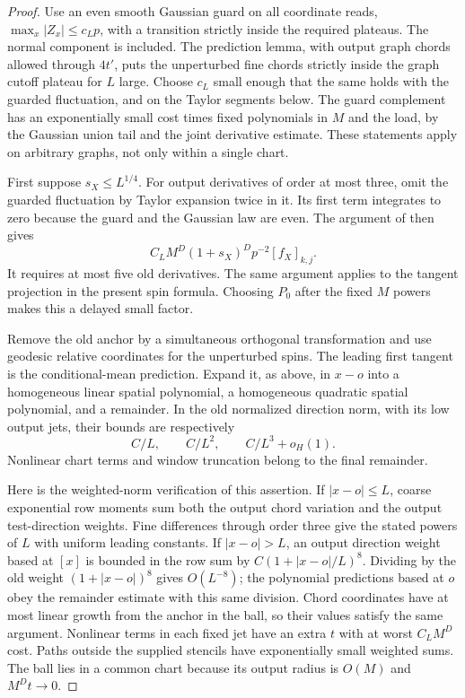 \begin{proof}
Use an even smooth Gaussian guard on all coordinate reads,
$\max_x|Z_x|\le c_Lp$, with a transition strictly inside the required
plateaus.  The normal component is included.  The prediction lemma,
with output graph chords allowed through $4t'$, puts the unperturbed
fine chords strictly inside the graph cutoff plateau for $L$ large.
Choose $c_L$ small enough that the same holds with the guarded
fluctuation, and on the Taylor segments below.  The guard complement
has an exponentially small cost times fixed polynomials in $M$ and
the load, by the Gaussian union tail and the joint derivative
estimate.  These statements apply on arbitrary graphs, not only
within a single chart.

First suppose $s_X\le L^{1/4}$.  For output derivatives of order at
most three, omit the guarded fluctuation by Taylor expansion twice
in it.  Its first term integrates to zero because the guard and the
Gaussian law are even.  The argument of
 then gives
\[
 C_LM^D(1+s_X)^Dp^{-2}[f_X]_{k,j}.
\]
It requires at most five old derivatives.  The same argument applies
to the tangent projection in the present spin formula.  Choosing
$P_0$ after the fixed $M$ powers makes this a delayed small factor.

Remove the old anchor by a simultaneous orthogonal transformation
and use geodesic relative coordinates for the unperturbed spins.
The leading first tangent is the conditional-mean prediction.  Expand
it, as above, in $x-o$ into a homogeneous linear spatial polynomial,
a homogeneous quadratic spatial polynomial, and a remainder.  In the
old normalized direction norm, with its low output jets, their bounds
are respectively
\begin{equation}
 C/L,\qquad C/L^2,\qquad C/L^3+o_H(1).
 \label{eq:orig-10}
\end{equation}
Nonlinear chart terms and window truncation belong to the final
remainder.

Here is the weighted-norm verification of this assertion.  If
$|x-o|\le L$, coarse exponential row moments sum both the output
chord variation and the output test-direction weights.  Fine
differences through order three give the stated powers of $L$ with
uniform leading constants.  If $|x-o|>L$, an output direction weight
based at $[x]$ is bounded in the row sum by
$C(1+|x-o|/L)^8$.  Dividing by the old weight
$(1+|x-o|)^8$ gives $O(L^{-8})$; the polynomial predictions based at
$o$ obey the remainder estimate with this same division.  Chord
coordinates have at most linear growth from the anchor in the ball,
so their values satisfy the same argument.  Nonlinear terms in each
fixed jet have an extra $t$ with at worst $C_LM^D$ cost.  Paths outside
the supplied stencils have exponentially small weighted sums.
The ball lies in a common chart because its output radius is $O(M)$
and $M^Dt\to0$.


\end{proof}
